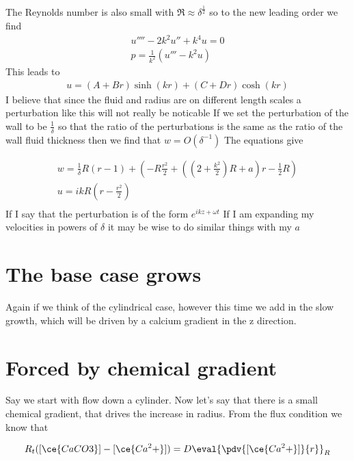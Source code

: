\documentclass[12pt]{article}
\begin{document}
The Reynolds number is also small with $\Re\approx\delta^{\frac{1}{2}}$
so to the new leading order we find
\begin{align}
u'''' - 2k^2 u'' + k^4 u =0\\
p = \frac{1}{k^2}(u'''-k^2 u)
\end{align}
This leads to 
\begin{align}
u = (A+Br) \sinh(kr)+ (C+ Dr)\cosh(kr)
\end{align}
I believe that since the fluid and radius are on different length scales a perturbation like this will not really be noticable
If we set the perturbation of the wall to be $\frac{1}{\delta}$ so that the ratio of the perturbations is the same as the ratio of the wall fluid thickness then we find that $w = O(\delta^{-1})$ The equations give

\begin{align}
w = \frac{1}{\delta}R(r-1)+\left(-R\frac{r^2}{2} +(\left(2+\frac{k^2}{2}\right)R+ a)r - \frac{1}{2} R\right)\\
u = ik R(r- \frac{r^2}{2})\\
\end{align}
If I say that the perturbation is of the form $e^{ik z + \omega t}$ If I am expanding my velocities in powers of $\delta$ it may be wise to do similar things with my $a$

\section{The base case grows} 
Again if we think of the cylindrical case, however this time we add in the slow growth, which will be driven by 
 a calcium gradient in the z direction.
 
 \section{Forced by chemical gradient}
 
 Say we start with flow down a cylinder. Now let's say that there is a small chemical gradient, that drives the increase in radius. 
 From the flux condition we know that
 
 \begin{align}
 R_t([\ce{CaCO3}] - [\ce{Ca^2+}])= D\eval{\pdv{[\ce{Ca^2+}]}{r}}_R
 \end{align}
 
\end{document}
